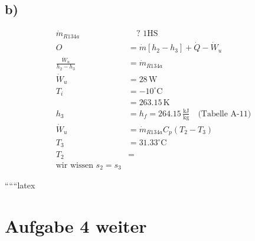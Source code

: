 

\subsection*{b)}

\begin{align*}
    \dot{m}_{R134a} & \quad \text{? 1HS} \\
    O &= \dot{m} \left[ h_2 - h_3 \right] + \dot{Q} - \dot{W}_u \\
    \frac{\dot{W}_u}{h_2 - h_3} &= \dot{m}_{R134a} \\
    \dot{W}_u &= 28 \, \text{W} \\
    T_i &= -10^\circ \text{C} \\
    &= 263.15 \, \text{K} \\
    h_3 &= h_f = 264.15 \, \frac{\text{kJ}}{\text{kg}} \quad \text{(Tabelle A-11)} \\
    \dot{W}_u &= \dot{m}_{R134a} C_p (T_2 - T_3) \\
    T_3 &= 31.33^\circ \text{C} \\
    T_2 &= \\
    \text{wir wissen } s_2 = s_3
\end{align*}

``````latex


\section*{Aufgabe 4 weiter}